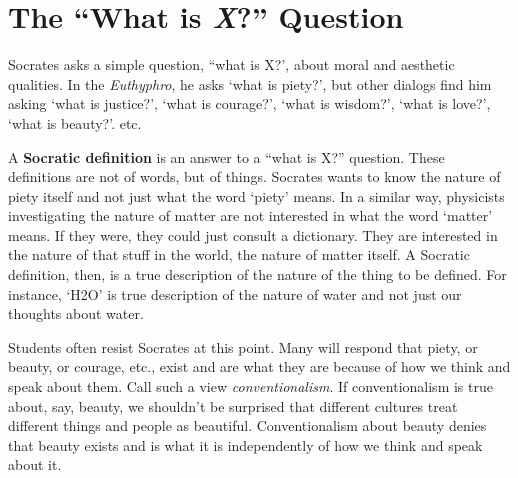 \documentclass[oneside]{article}
\begin{document}


%

\section*{The ``What is \emph{X}?'' Question}

Socrates asks a simple question, ``what is X?', about moral and aesthetic qualities. In the \emph{Euthyphro}, he asks `what is piety?', but other dialogs find him asking `what is justice?', `what is courage?', `what is wisdom?', `what is love?', `what is beauty?'. etc.

A \textbf{Socratic definition} is an answer to a ``what is X?'' question. These definitions are not of words, but of things. Socrates wants to know the nature of piety itself and not just what the word `piety' means. In a similar way, physicists investigating the nature of matter are not interested in what the word `matter' means. If they were, they could just consult a dictionary. They are interested in the nature of that stuff in the world, the nature of matter itself.  A Socratic definition, then, is a true description of the nature of the thing to be defined. For instance, `H2O' is true description of the nature of water and not just our thoughts about water. 

Students often resist Socrates at this point. Many will respond that piety, or beauty, or courage, etc., exist and are what they are because of how we think and speak about them. Call such a view \emph{conventionalism}.  If conventionalism is true about, say, beauty, we shouldn't be surprised that different cultures treat different things and people as beautiful. Conventionalism about beauty denies that beauty exists and is what it is independently of how we think and speak about it. 
\end{document}
